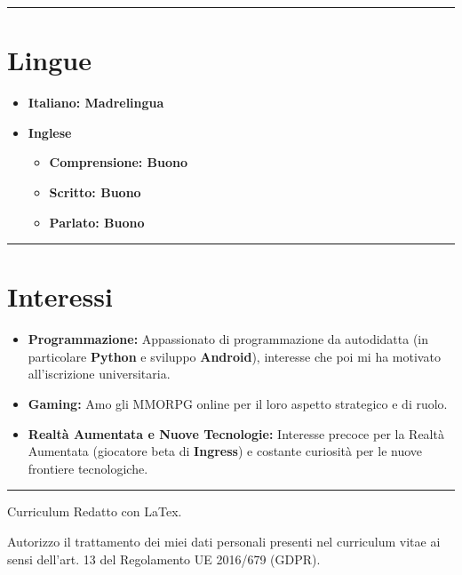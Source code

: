 \documentclass{article}
\begin{document}
\hrule

\section*{\large{Lingue}}
	\begin{itemize}
	  \item {\normalsize{\textbf{Italiano: Madrelingua}}}
	  \vspace {0.2cm}
	  \item {\normalsize{\textbf{Inglese}}}
	  \begin{itemize}
	    \item {\normalsize{\textbf{Comprensione: Buono}}}
	    \item {\normalsize{\textbf{Scritto: Buono}}}
	    \item {\normalsize{\textbf{Parlato: Buono}}}
	    \end{itemize}
	\end{itemize}
	
\hrule

\section*{\large{Interessi}}
	\begin{itemize}
	\item {\normalsize{\textbf{Programmazione:} Appassionato di programmazione da autodidatta (in particolare \textbf{Python}
	e sviluppo \textbf{Android}), interesse che poi mi ha motivato all'iscrizione universitaria.}}
  	\item {\normalsize{\textbf{Gaming:} Amo gli MMORPG online per il loro aspetto strategico e di ruolo.}}
  	\item {\normalsize{\textbf{Realtà Aumentata e Nuove Tecnologie:} Interesse precoce per la Realtà Aumentata
  	(giocatore beta di \textbf{Ingress}) e costante curiosità per le nuove frontiere tecnologiche.}}
	\end{itemize}

\hrule

\vspace{0.2cm}
\normalsize
\begin{center}
Curriculum Redatto con LaTex.
\end{center}

\vspace{1cm}
\normalsize
Autorizzo il trattamento dei miei dati personali presenti nel curriculum vitae ai sensi dell’art. 13 del Regolamento UE 2016/679 (GDPR).
\end{document}
